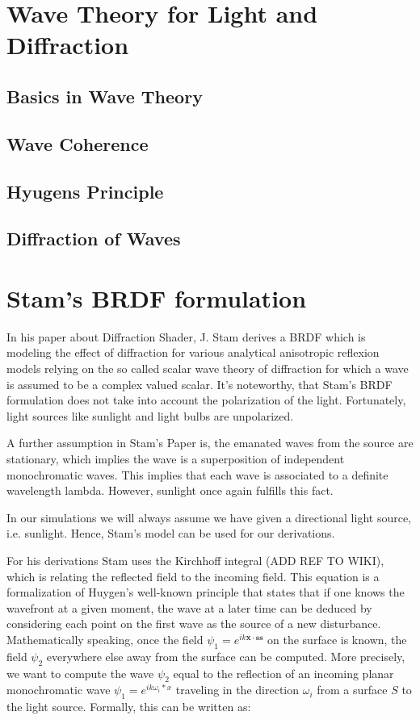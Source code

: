 \section{Wave Theory for Light and Diffraction}
\subsection{Basics in Wave Theory}
\subsection{Wave Coherence}
\subsection{Hyugens Principle}
\subsection{Diffraction of Waves}

\section{Stam's BRDF formulation}
\label{sec:sumstam}
In his paper about Diffraction Shader, J. Stam derives a BRDF which is modeling the effect of diffraction for various analytical anisotropic reflexion models relying on the so called scalar wave theory of diffraction for which a wave is assumed to be a complex valued scalar. 
It's noteworthy, that Stam's BRDF formulation does not take into account the polarization of the light. Fortunately, light sources like sunlight and light bulbs are unpolarized. 

A further assumption in Stam's Paper is, the emanated waves from the source are stationary, which implies the wave is a superposition of independent monochromatic waves. This implies that each wave is associated to a definite wavelength lambda. However, sunlight once again fulfills this fact.

In our simulations we will always assume we have given a directional light source, i.e. sunlight. Hence, Stam's model can be used for our derivations.

For his derivations Stam uses the Kirchhoff integral (ADD REF TO WIKI), which is relating the reflected field to the incoming field. This equation is a formalization of Huygen’s well-known principle that states that if one knows the wavefront at a given moment, the wave at a later time can be deduced by considering each point on the first wave as the source of a new disturbance. Mathematically speaking, once the field  $\psi_1 =  e^{ik\mathbf{x} \cdot \mathbf{s}\mathbf{s}}$ on the surface is known, the field $\psi_2$ everywhere else away from the surface can be computed.
More precisely, we want to compute the wave $\psi_2$ equal to the reflection of an incoming planar monochromatic wave $\psi_1 = e^{ik \omega_i * x}$  traveling in the direction $\omega_i$ from a surface $S$ to the light source. Formally, this can be written as:

